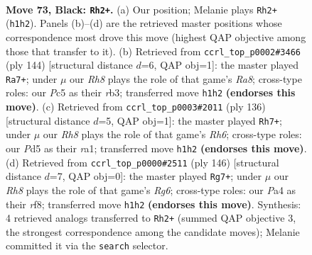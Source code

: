\documentclass[11pt]{article}
\begin{document}
\clearpage

\begin{figure}[p]\centering
\begin{subfigure}{0.46\textwidth}\centering
\resizebox{\linewidth}{!}{%
\newchessgame
\chessboard[
  setfen={8/4k3/8/2pp4/p7/8/3K4/7r b - - 3 73},
  showmover=false,
  pgfstyle=straightmove, color=movearrow, markmove={h1-h2}
]}
\caption{}
\end{subfigure}\hfill
\begin{subfigure}{0.46\textwidth}\centering
\resizebox{\linewidth}{!}{%
\newchessgame
\chessboard[
  setfen={R7/4k3/8/6Pp/8/1r6/8/4K3 w - - 13 73},
  showmover=false,
  pgfstyle=straightmove, color=movearrow, markmove={a8-a7}
]}
\caption{}
\end{subfigure}
\\[4pt]
\begin{subfigure}{0.46\textwidth}\centering
\resizebox{\linewidth}{!}{%
\newchessgame
\chessboard[
  setfen={8/1k6/7R/2K5/P7/2P5/8/r7 w - - 25 69},
  showmover=false,
  pgfstyle=straightmove, color=movearrow, markmove={h6-h7}
]}
\caption{}
\end{subfigure}\hfill
\begin{subfigure}{0.46\textwidth}\centering
\resizebox{\linewidth}{!}{%
\newchessgame
\chessboard[
  setfen={5r2/k7/6R1/p7/8/2P5/K7/8 w - - 1 74},
  showmover=false,
  pgfstyle=straightmove, color=movearrow, markmove={g6-g7}
]}
\caption{}
\end{subfigure}
\caption{\textbf{Move 73, Black: \texttt{Rh2+}.} (a) Our position; Melanie plays \texttt{Rh2+} (\texttt{h1h2}). Panels (b)--(d) are the retrieved master positions whose correspondence most drove this move (highest QAP objective among those that transfer to it). (b) Retrieved from \texttt{ccrl\_top\_p0002\#3466} (ply 144) [structural distance $d$=6, QAP obj=1]: the master played \texttt{Ra7+}; under $\mu$ our \emph{Rh8} plays the role of that game's \emph{Ra8}; cross-type roles: our \emph{P}c5 as their \emph{r}b3; transferred move \texttt{h1h2} \textbf{(endorses this move)}. (c) Retrieved from \texttt{ccrl\_top\_p0003\#2011} (ply 136) [structural distance $d$=5, QAP obj=1]: the master played \texttt{Rh7+}; under $\mu$ our \emph{Rh8} plays the role of that game's \emph{Rh6}; cross-type roles: our \emph{P}d5 as their \emph{r}a1; transferred move \texttt{h1h2} \textbf{(endorses this move)}. (d) Retrieved from \texttt{ccrl\_top\_p0000\#2511} (ply 146) [structural distance $d$=7, QAP obj=0]: the master played \texttt{Rg7+}; under $\mu$ our \emph{Rh8} plays the role of that game's \emph{Rg6}; cross-type roles: our \emph{P}a4 as their \emph{r}f8; transferred move \texttt{h1h2} \textbf{(endorses this move)}. Synthesis: 4 retrieved analogs transferred to \texttt{Rh2+} (summed QAP objective 3, the strongest correspondence among the candidate moves); Melanie committed it via the \texttt{search} selector.}
\label{fig:thought-m145}
\end{figure}
\end{document}
